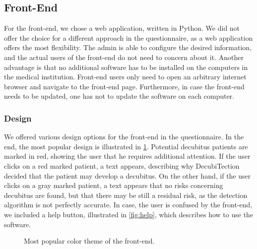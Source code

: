 \subsection{Front-End}
For the front-end, we chose a web application, written in Python. 
We did not offer the choice for a different approach in the questionnaire, as a web application offers the most flexibility. 
The admin is able to configure the desired information, and the actual users of the front-end do not need to concern about it.
Another advantage is that no additional software has to be installed on the computers in the medical institution. 
Front-end users only need to open an arbitrary internet browser and navigate to the front-end page. 
Furthermore, in case the front-end needs to be updated, one has not to update the software on each computer. 

\subsubsection{Design}
We offered various design options for the front-end in the questionnaire. 
In the end, the most popular design is illustrated in \ref{fig:gray-color}. 
Potential decubitus patients are marked in red, showing the user that he requires additional attention.
If the user clicks on a red marked patient, a text appears, describing why DecubiTection decided that the patient may develop a decubitus. 
On the other hand, if the user clicks on a gray marked patient, a text appears that no risks concerning decubitus are found, but that there may be still a residual risk, as the detection algorithm is not perfectly accurate. 
In case, the user is confused by the front-end, we included a help button, illustrated in \ref{fig:help}, which describes how to use the software. 

\begin{figure}[htp]
    \centering
    \caption{Most popular color theme of the front-end.}
    \label{fig:gray-color}
\end{figure}

